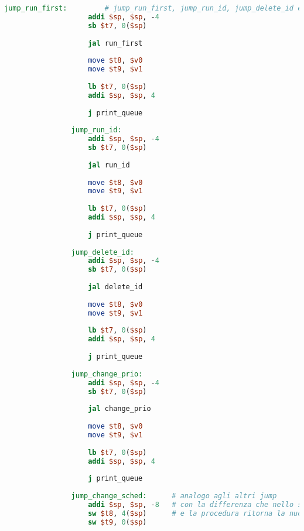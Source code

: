 \begin{center}
\begin{lstlisting}[language=mips, gobble=14, stepnumber=1]
                jump_run_first:         # jump_run_first, jump_run_id, jump_delete_id e jump_change_prio analoghi a jump_insert_task
                    addi $sp, $sp, -4
                    sb $t7, 0($sp)
                    
                    jal run_first
                    
                    move $t8, $v0
                    move $t9, $v1
                    
                    lb $t7, 0($sp)
                    addi $sp, $sp, 4
                    
                    j print_queue
                    
                jump_run_id:
                    addi $sp, $sp, -4
                    sb $t7, 0($sp)
                    
                    jal run_id
                    
                    move $t8, $v0
                    move $t9, $v1
                    
                    lb $t7, 0($sp)
                    addi $sp, $sp, 4
                    
                    j print_queue
                    
                jump_delete_id:
                    addi $sp, $sp, -4
                    sb $t7, 0($sp)
                    
                    jal delete_id
                    
                    move $t8, $v0
                    move $t9, $v1
                    
                    lb $t7, 0($sp)
                    addi $sp, $sp, 4
                    
                    j print_queue
                    
                jump_change_prio:
                    addi $sp, $sp, -4
                    sb $t7, 0($sp)
                    
                    jal change_prio
                    
                    move $t8, $v0
                    move $t9, $v1
                    
                    lb $t7, 0($sp)
                    addi $sp, $sp, 4
                    
                    j print_queue
                    
                jump_change_sched:      # analogo agli altri jump
                    addi $sp, $sp, -8   # con la differenza che nello stack si salvano i due puntatori
                    sw $t8, 4($sp)      # e la procedura ritorna la nuova politica di scheduling
                    sw $t9, 0($sp)
                    

\end{lstlisting}
\end{center}
